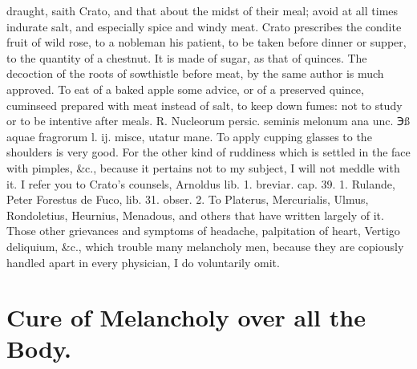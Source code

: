 draught, saith Crato, and that about the midst of their meal; avoid at
all times indurate salt, and especially spice and windy meat.
Crato prescribes the condite fruit of wild rose, to a nobleman
his patient, to be taken before dinner or supper, to the quantity of a
chestnut. It is made of sugar, as that of quinces. The decoction of the
roots of sowthistle before meat, by the same author is much approved.
To eat of a baked apple some advice, or of a preserved quince,
cuminseed prepared with meat instead of salt, to keep down fumes: not
to study or to be intentive after meals.
℞. Nucleorum persic. seminis melonum ana unc. ℈ß aquae fragrorum l. ij.
misce, utatur mane.
To apply cupping glasses to the shoulders is very good. For the
other kind of ruddiness which is settled in the face with pimples, \&c.,
because it pertains not to my subject, I will not meddle with it. I
refer you to Crato's counsels, Arnoldus lib. 1. breviar. cap. 39. 1.
Rulande, Peter Forestus de Fuco, lib. 31. obser. 2. To Platerus,
Mercurialis, Ulmus, Rondoletius, Heurnius, Menadous, and others that
have written largely of it.
Those other grievances and symptoms of headache, palpitation of heart,
Vertigo deliquium, \&c., which trouble many melancholy men, because they
are copiously handled apart in every physician, I do voluntarily omit.


\section{Cure of Melancholy over all the Body.}

